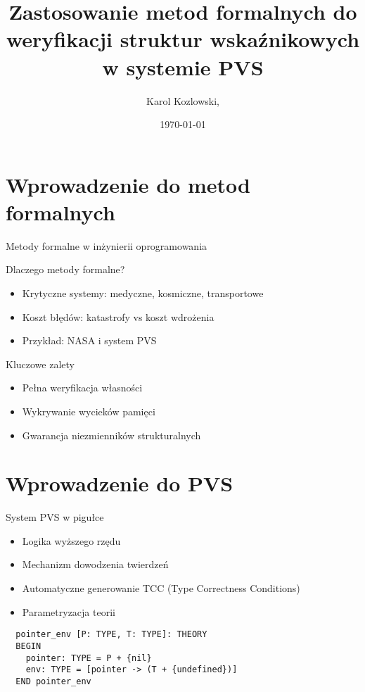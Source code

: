 \documentclass{beamer}
\title{Zastosowanie metod formalnych do weryfikacji struktur wskaźnikowych w systemie PVS}
\author{Karol Kozlowski,}
\institute{Wydzial elektryczny, Politechnika Warszawska}
\date{\today}
\begin{document}
\begin{frame}
\titlepage
\end{frame}

\begin{frame}
\tableofcontents
\end{frame}

\section{Wprowadzenie do metod formalnych}
\begin{frame}{Metody formalne w inżynierii oprogramowania}
\begin{block}{Dlaczego metody formalne?}
\begin{itemize}
\item Krytyczne systemy: medyczne, kosmiczne, transportowe
\item Koszt błędów: katastrofy vs koszt wdrożenia
\item Przykład: NASA i system PVS
\end{itemize}
\end{block}

\begin{exampleblock}{Kluczowe zalety}
\begin{itemize}
\item Pełna weryfikacja własności
\item Wykrywanie wycieków pamięci
\item Gwarancja niezmienników strukturalnych
\end{itemize}
\end{exampleblock}
\end{frame}

\section{Wprowadzenie do PVS}
\begin{frame}[fragile]{System PVS w pigułce}


\begin{itemize}
\item Logika wyższego rzędu
\item Mechanizm dowodzenia twierdzeń
\item Automatyczne generowanie TCC (Type Correctness Conditions)
\item Parametryzacja teorii
\end{itemize}


\begin{verbatim}
  pointer_env [P: TYPE, T: TYPE]: THEORY
  BEGIN
    pointer: TYPE = P + {nil}
    env: TYPE = [pointer -> (T + {undefined})]
  END pointer_env
\end{verbatim}
\end{frame}
\end{document}
